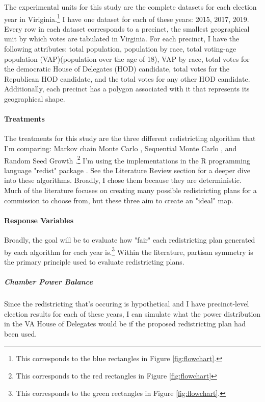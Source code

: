 The experimental units for this study are the complete datasets for each election year in Viriginia.\footnote{This corresponds to the blue rectangles in Figure \ref{fig:flowchart}.} I have one dataset for each of these years: 2015, 2017, 2019. Every row in each dataset corresponds to a precinct, the smallest geographical unit by which votes are tabulated in Virginia. For each precinct, I have the following attributes: total population, population by race, total voting-age population (VAP)(population over the age of 18), VAP by race, total votes for the democratic House of Delegates (HOD) candidate, total votes for the Republican HOD candidate, and the total votes for any other HOD candidate. Additionally, each precinct has a polygon associated with it that represents its geographical shape. 

\paragraph{Treatments}

The treatments for this study are the three different redistricting algorithm that I'm comparing: Markov chain Monte Carlo \parencite{fifield2020}, Sequential Monte Carlo \parencite{mccartan2020}, and Random Seed Growth \parencite{chen2013}.\footnote{This corresponds to the red rectangles in Figure \ref{fig:flowchart}} I'm using the implementations in the R programming language "redist" package \parencite{fifield2020d}. See the Literature Review section for a deeper dive into these algorithms. Broadly, I chose them because they are deterministic. Much of the literature focuses on creating many possible redistricting plans for a commission to choose from, but these three aim to create an "ideal" map. 

\paragraph{Response Variables}

Broadly, the goal will be to evaluate how "fair" each redistricting plan generated by each algorithm for each year is.\footnote{This corresponds to the green rectangles in Figure \ref{fig:flowchart}.} Within the literature, partisan symmetry is the primary principle used to evaluate redistricting plans. 

\subparagraph{Chamber Power Balance}

Since the redistricting that's occuring is hypothetical and I have precinct-level election results for each of these years, I can simulate what the power distribution in the VA House of Delegates would be if the proposed redistricting plan had been used. 

